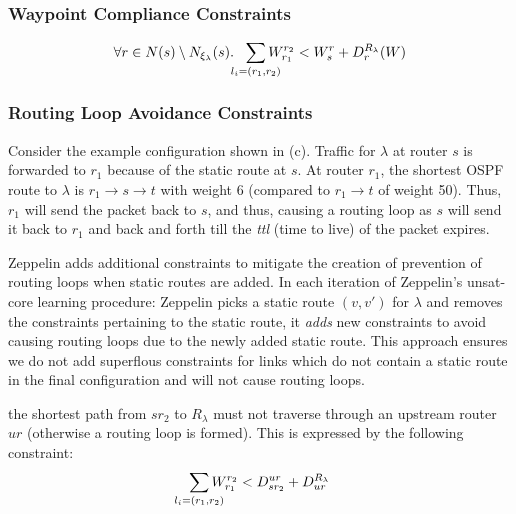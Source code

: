\subsubsection{Waypoint Compliance Constraints}

\begin{equation} \label{eq:waypoint}
\forall r \in N(s) \setminus N_{\xi_\lambda}(s).~~ \sum_{\mathclap{\substack{l_i=(r_1,r_2)}}} 
W_{r_1}^{r_2} < 
W_{s}^{r}+ D_{r}^{R_\lambda}(W) 
\end{equation}

\subsubsection{Routing Loop Avoidance Constraints} \label{sec:loopavoidance}
Consider the example configuration shown in (c). 
Traffic for $\lambda$ at router $s$ is forwarded to $r_1$ because of the
static route at $s$. At router $r_1$, the shortest OSPF route to
$\lambda$ is $r_1 \rightarrow s \rightarrow t$ with weight 6 (compared 
to $r_1 \rightarrow t$ of weight 50). Thus, $r_1$ will send the 
packet back to $s$, and thus, causing a routing loop as $s$ will send
it back to $r_1$ and back and forth till the \emph{ttl} (time to live) of the
packet expires. 

Zeppelin adds additional constraints to mitigate the creation of prevention
of routing loops when static routes are added. In each iteration of
Zeppelin's unsat-core learning procedure: 
Zeppelin picks a static route $(v, v')$
for $\lambda$ and removes the constraints pertaining to 
the static route, it \emph{adds} new constraints to avoid
causing routing loops due to the newly added static route. This
approach ensures we do not add superflous constraints for links
which do not contain a static route in the final configuration 
and will not cause routing loops.  

the shortest
path from $sr_2$ to $R_\lambda$ must not traverse through an upstream router 
$ur$ (otherwise a routing loop is formed). 
This is expressed by the following constraint: 
\[
\sum_{\mathclap{\substack{l_i=(r_1,r_2)}}} 
W_{r_1}^{r_2} < D^{ur}_{sr_2} + D_{ur}^{R_\lambda} 
\]		
